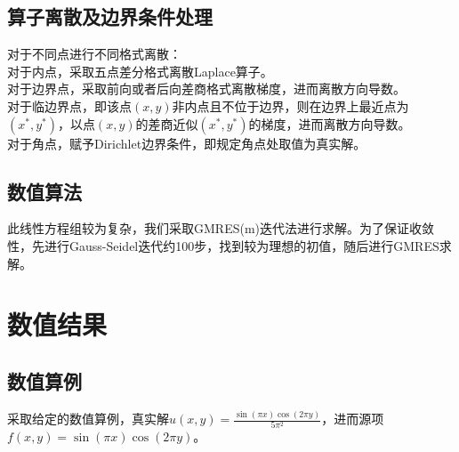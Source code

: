 \documentclass[11pt,a4 paper,one side]{article}
\begin{document}
\subsection{算子离散及边界条件处理}
对于不同点进行不同格式离散：
\\ 对于内点，采取五点差分格式离散Laplace算子。
\\ 对于边界点，采取前向或者后向差商格式离散梯度，进而离散方向导数。
\\ 对于临边界点，即该点$(x,y)$非内点且不位于边界，则在边界上最近点为$(x^*,y^*)$，以点$(x,y)$的差商近似$(x^*,y^*)$的梯度，进而离散方向导数。
\\ 对于角点，赋予Dirichlet边界条件，即规定角点处取值为真实解。
\subsection{数值算法}
此线性方程组较为复杂，我们采取GMRES(m)迭代法进行求解。为了保证收敛性，先进行Gauss-Seidel迭代约100步，找到较为理想的初值，随后进行GMRES求解。
\section{数值结果}
\subsection{数值算例}
采取给定的数值算例，真实解$u(x,y)=\frac{\sin(\pi x)\cos(2\pi y)}{5\pi^2}$，进而源项$f(x,y)=\sin(\pi x)\cos(2\pi y)$。
\end{document}
